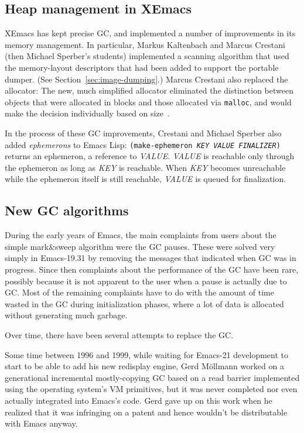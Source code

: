 \documentclass[format=acmsmall, review]{acmart}
\newcommand \Elisp {Emacs Lisp}
\newcommand \id[1] {\textrm{\textsl{#1}}}
\begin{document}
\subsection{Heap management in XEmacs}
\label{sec:heap-xemacs}

XEmacs has kept precise GC, and implemented a number of improvements
in its memory management.  In particular, Markus Kaltenbach and Marcus
Crestani (then Michael Sperber's students)
implemented a scanning algorithm that used the memory-layout
descriptors that had been added to support the portable dumper.  (See
Section~\ref{sec:image-dumping}.)  Marcus Crestani also replaced the
allocator: The new, much simplified allocator eliminated the
distinction between objects that were allocated in blocks and those
allocated via \texttt{malloc}, and would make the decision
individually based on size~\cite{Crestani2005}.

In the process of these GC improvements, Crestani and Michael Sperber
also added \emph{ephemerons} to \Elisp{}: \texttt{(make-ephemeron
  \id{KEY} \id{VALUE} \id{FINALIZER})} returns an ephemeron, a reference
to \id{VALUE}.  \id{VALUE} is reachable only through the ephemeron as
long as \id{KEY} is reachable.  When \id{KEY} becomes unreachable while
the ephemeron itself is still reachable, \id{VALUE} is queued for
finalization.

\subsection{New GC algorithms}
\label{sec:gc-algorithms}

During the early years of Emacs, the main complaints from users about the
simple mark\&sweep algorithm were the GC pauses.  These were solved very
simply in Emacs-19.31 by removing the messages that indicated when GC was in
progress.  Since then complaints about the performance of the GC have been
rare, possibly because it is not apparent to the user when a pause is
actually due to GC.  Most of the remaining complaints have to do with
the amount of time wasted in the
GC during initialization phases, where a lot of data is allocated without
generating much garbage.

Over time, there have been several attempts to replace the GC.

Some time between 1996 and 1999, while waiting for Emacs-21 development to
start to be able to add his new redisplay engine, Gerd
Möllmann worked on a generational incremental mostly-copying GC based on
a read barrier implemented using the operating system's VM primitives, but
it was never completed nor even actually integrated into Emacs's code.
Gerd gave up on this work when he realized that it was infringing on
a patent and hence wouldn't be distributable with Emacs anyway.
\end{document}
